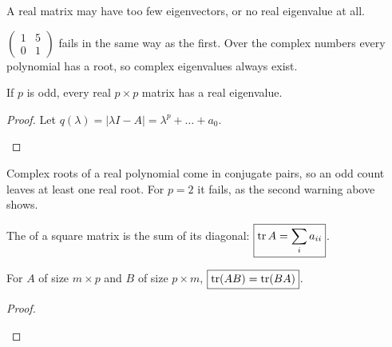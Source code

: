 \begin{example}
A real matrix may have too few eigenvectors, or no real eigenvalue at all.
\begin{deriv}
\end{deriv}
$\begin{pmatrix}1&5\\0&1\end{pmatrix}$ fails in the same way as the first. Over the complex numbers every polynomial has a root, so complex eigenvalues always exist.
\end{example}

\begin{result}
If $p$ is odd, every real $p\times p$ matrix has a real eigenvalue.
\end{result}
\begin{proof}
Let $q(\lambda)=|\lambda I-A|=\lambda^p+\dots+a_0$.
\begin{deriv}
\end{deriv}
\end{proof}
Complex roots of a real polynomial come in conjugate pairs, so an odd count leaves at least one real root. For $p=2$ it fails, as the second warning above shows.

\begin{definition}[Trace]
The  of a square matrix is the sum of its diagonal: $\boxed{\operatorname{tr} A=\sum_ia_{ii}}$.
\end{definition}

\begin{result}
For $A$ of size $m\times p$ and $B$ of size $p\times m$, $\boxed{\operatorname{tr}(AB)=\operatorname{tr}(BA)}$.
\end{result}
\begin{proof}
\begin{deriv}
\end{deriv}
\end{proof}

